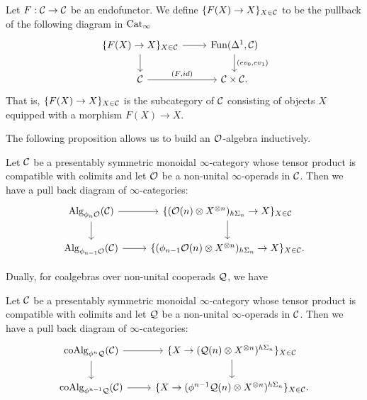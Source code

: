 \begin{definition}
Let $F:{\mathcal{C}}\to {\mathcal{C}}$ be an endofunctor.
	We define $\{F(X) \to X\}_{X \in {\mathcal{C}}}$ to be the pullback of the following diagram in $\operatorname{Cat}_{\infty}$
\[
\begin{tikzcd}
	\{F(X) \to X\}_{X \in \CC} & 
	\Fun(\Delta^1, \CC)\\
	\CC & 
	\CC \times \CC
	\arrow[from=1-1, to= 1-2]
	\arrow[from=1-1, to=2-1]
	\arrow[from=1-2, to=2-2, "(ev_0\text{,} ev_1)"]
	\arrow[from=2-1, to= 2-2, "(F\text{,} id)"].
\end{tikzcd}
\]
That is, $\{F(X) \to X\}_{X \in {\mathcal{C}}}$ is the subcategory of ${\mathcal{C}}$ consisting of objects $X$ equipped with a morphism $F(X)\to X$.
\end{definition}


The following proposition allows us to build an ${\mathcal{O}}$-algebra inductively.
\begin{proposition}

	Let ${\mathcal{C}}$ be a presentably symmetric monoidal $\infty$-category whose tensor product is compatible with colimits and let ${\mathcal{O}}$ be a non-unital $\infty$-operads in ${\mathcal{C}}$.
	Then we have a pull back diagram of $\infty$-categories:
\[
\begin{tikzcd}
	\Alg_{\phi_n \CO}(\CC) & 
	\{(\CO(n)\otimes X^{\otimes n})_{h\Sigma_n} \to X\}_{X \in \CC}\\
	\Alg_{\phi_{n-1} \CO}(\CC) & 
	\{(\phi_{n-1}\CO(n)\otimes X^{\otimes n})_{h\Sigma_n}\to X   \}_{X\in \CC}.
	\arrow[from=1-1, to= 1-2]
	\arrow[from=1-1, to=2-1]
	\arrow[from=1-2, to=2-2]
	\arrow[from=2-1, to= 2-2]
\end{tikzcd}
\]
\end{proposition}

Dually, for coalgebras over non-unital cooperads ${\mathcal{Q}}$, we have 
\begin{proposition}
\label{inductive construction of coalgebras}
	Let ${\mathcal{C}}$ be a presentably symmetric monoidal $\infty$-category whose tensor product is compatible with colimits and let ${\mathcal{Q}}$ be a non-unital $\infty$-operads in ${\mathcal{C}}$.
	Then we have a pull back diagram of $\infty$-categories:
\[
\begin{tikzcd}
	\coAlg_{\phi^n \CQ}(\CC) & 
	\{X \to (\CQ(n)\otimes X^{\otimes n})^{h\Sigma_n} \}_{X \in \CC}\\
	\coAlg_{\phi^{n-1} \CQ}(\CC) & 
	\{ X \to (\phi^{n-1}\CQ(n)\otimes X^{\otimes n})^{h\Sigma_n}   \}_{X\in \CC}.
	\arrow[from=1-1, to= 1-2]
	\arrow[from=1-1, to=2-1]
	\arrow[from=1-2, to=2-2]
	\arrow[from=2-1, to= 2-2]
\end{tikzcd}
\]
\end{proposition}


